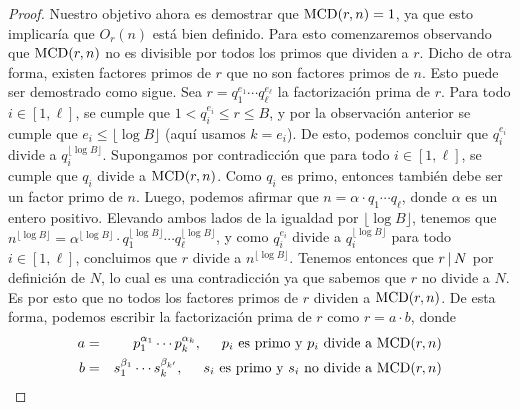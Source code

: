 \begin{proof}
Nuestro objetivo ahora es demostrar que ${\rm MCD}(r,n) =1 $, ya que esto implicaría que $O_r(n)$ está bien definido. 
Para esto comenzaremos observando que ${\rm MCD}(r,n)$ no es divisible por todos los primos que dividen a $r$. Dicho de otra forma, existen factores primos de $r$ que no son factores primos de $n$. Esto puede ser demostrado como sigue. Sea $r=q_1^{e_1}\cdots q_{\ell}^{e_{\ell}}$ la factorización prima de $r$.
Para todo $i\in [1, \ell]$, se cumple que $1<q_i^{e_i}\leq r\leq B$, y por la observación anterior se cumple que $e_i\leq \lfloor\log B\rfloor$ (aquí usamos $k=e_i$). De esto, podemos concluir que $q_i^{e_i}$ divide a $q_i^{\lfloor\log B\rfloor}$.
 Supongamos por contradicción que para todo $i\in [1, \ell]$, se cumple que $q_i$ divide a ${\rm MCD}(r,n)$. Como $q_i$ es primo, entonces también debe ser un factor primo de $n$. Luego, podemos afirmar que $n=\alpha\cdot q_1\cdots q_{\ell}$, donde $\alpha$ es un entero positivo. Elevando ambos lados de la igualdad por $\lfloor\log B\rfloor$, tenemos que $n^{\lfloor\log B\rfloor}=\alpha^{\lfloor\log B\rfloor}\cdot q_1^{\lfloor\log B\rfloor}\cdots q_{\ell}^{\lfloor\log B\rfloor}$, y como $q_i^{e_i}$ divide a $q_i^{\lfloor\log B\rfloor}$ para todo $i\in [1, \ell]$, concluimos que $r$ divide a $n^{\lfloor\log B\rfloor}$. Tenemos entonces que $r \hspace{1.8pt}|\hspace{1.8pt} N$ por definición de $N$, 
 lo cual es una contradicción ya que sabemos que $r$ no divide a $N$. Es por esto que no todos los factores primos de $r$ dividen a ${\rm MCD}(r,n)$. De esta forma, podemos escribir la factorización prima de $r$ como $r = a\cdot b$, donde
 \begin{eqnarray*}
 	a&=& p_1^{\alpha_1}\cdots p_k^{\alpha_k},\hspace{0.5cm}p_i\text{ es primo y $p_i$ divide a }{\rm MCD}(r,n)\\
 	b&=& s_1^{\beta_1}\cdots s_k^{\beta_{k'}},\hspace{0.5cm}s_i\text{ es primo y $s_i$ no divide a }{\rm MCD}(r,n)
 \end{eqnarray*}

\end{proof}
